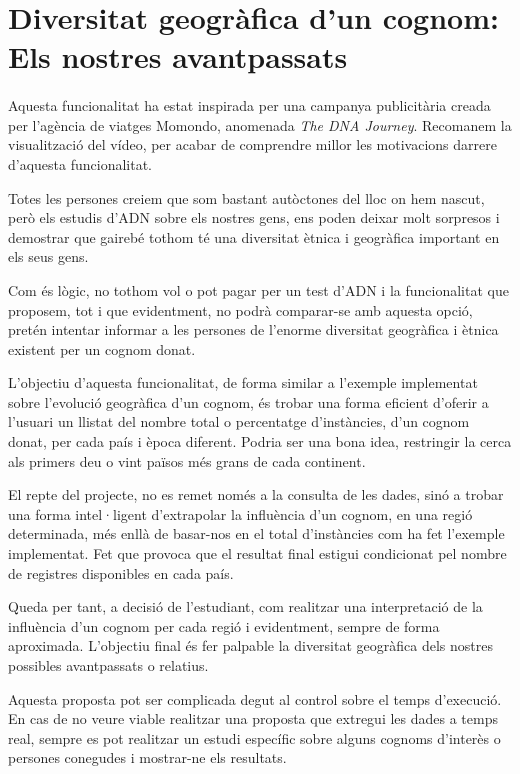 \section{Diversitat geogràfica d'un cognom: Els nostres a\-vant\-pa\-ssats}

    \paragraph{}
    Aquesta funcionalitat ha estat inspirada per una campanya publicitària creada per l'agència de viatges Momondo, anomenada \emph{The DNA Journey}. Recomanem la visualització del vídeo, per acabar de comprendre millor les motivacions darrere d'aquesta funcionalitat.

    Totes les persones creiem que som bastant autòctones del lloc on hem nascut, però els estudis d'ADN sobre els nostres gens, ens poden deixar molt sorpresos i demostrar que gairebé tothom té una diversitat ètnica i geogràfica important en els seus gens.

    Com és lògic, no tothom vol o pot pagar per un test d'ADN i la funcionalitat que proposem, tot i que evidentment, no podrà comparar-se amb aquesta opció, pretén intentar informar a les persones de l’enorme diversitat geogràfica i ètnica existent per un cognom donat.

    L'objectiu d'aquesta funcionalitat, de forma similar a l'exemple implementat sobre l'evolució geogràfica d'un cognom, és trobar una forma eficient d'oferir a l'usuari un llistat del nombre total o percentatge d'instàncies, d'un cognom donat, per cada país i època diferent. Podria ser una bona idea, restringir la cerca als primers deu o vint països més grans de cada continent.

    El repte del projecte, no es remet només a la consulta de les dades, sinó a trobar una forma intel·ligent d'extrapolar la influència d'un cognom, en una regió determinada, més enllà de basar-nos en el total d'instàncies com ha fet l'exemple implementat. Fet que provoca que el resultat final estigui condicionat pel nombre de registres disponibles en cada país.

    Queda per tant, a decisió de l'estudiant, com realitzar una interpretació de la influència d'un cognom per cada regió i evidentment, sempre de forma aproximada. L'objectiu final és fer palpable la diversitat geogràfica dels nostres possibles avantpassats o relatius.

    Aquesta proposta pot ser complicada degut al control sobre el temps d'execució. En cas de no veure viable realitzar una proposta que extregui les dades a temps real, sempre es pot realitzar un estudi específic sobre alguns cognoms d'interès o persones conegudes i mostrar-ne els resultats.
